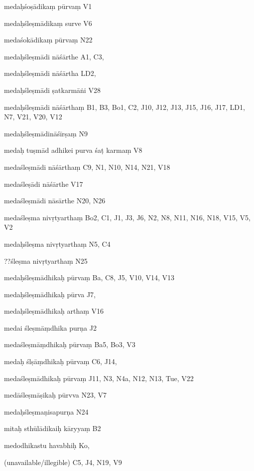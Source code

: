 \begin{ekdosis}
\begin{marma}[hp01_055]
\begin{marma}[hp02_009]
\begin{marma}[hp02_011]
\begin{marma}[hp02_021]
\item[medaḥśoṣādikaṃ pūrvaṃ] V1
\item[medaḥśleṣmādikaṃ surve] V6
\item[medaśokādikaṃ pūrvaṃ] N22
\item[medaḥśleṣmādi nāśārthe] A1, C3,
\item[medaḥśleṣmādi nāśārtha] LD2,
\item[medaḥśleṣmādi ṣatkarmāṅi] V28
\item[medaḥśleṣmādi nāśārthaṃ] B1, B3, Bo1, C2, J10, J12, J13, J15, J16, J17, LD1, N7, V21, V20, V12
\item[medaḥśleṣmādināśīrṣaṃ] N9
\item[medaḥ tuṣmād adhikei purva śaṭ karmaṃ] V8
\item[medaśleṣmādi nāśārthaṃ] C9, N1, N10, N14, N21, V18
\item[medaśleṣādi nāśārthe] V17
\item[medaśleṣmādi nāsārthe] N20, N26
\item[medaśleṣma nivṛtyarthaṃ] Bo2, C1, J1, J3, J6, N2, N8, N11, N16, N18, V15, V5, V2
\item[medaḥśleṣma nivṛtyarthaṃ] N5, C4
\item[??śleṣma nivṛtyarthaṃ] N25
\item[medaḥśleṣmādhikaḥ pūrvaṃ] Ba, C8, J5, V10, V14, V13
\item[medaḥśleṣmādhikaḥ pūrva] J7,
\item[medaḥśleṣmādhikaḥ arthaṃ] V16
\item[medai śleṣmāṃdhika purṇa] J2
\item[medaśleṣmāṃdhikaḥ pūrvaṃ] Ba5, Bo3, V3
\item[medaḥ ślṣāṃdhikaḥ pūrvaṃ] C6, J14, 
\item[medaśleṣmādhikaḥ pūrvaṃ]  J11, N3, N4a, N12, N13, Tue, V22
\item[medāśleṣmāṣikaḥ pūrvva] N23, V7
\item[medaḥśleṣmaṇisapurṇa] N24 
\item[mitaḥ sthūlādikaiḥ kāryyaṃ] B2
\item[medodhikastu havabhiḥ] Ko,
\item[(unavailable/illegible)] C5, J4, N19, V9
 \begin{description}

        \end{description}
\end{marma}



\end{marma}
\end{marma}
\end{marma}
\end{ekdosis}
